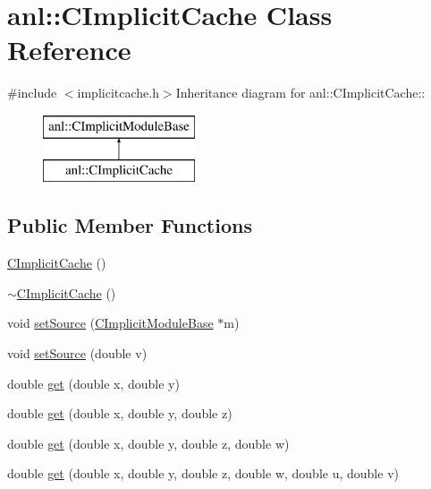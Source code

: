 \hypertarget{classanl_1_1CImplicitCache}{
\section{anl::CImplicitCache Class Reference}
\label{classanl_1_1CImplicitCache}
}


{\ttfamily \#include $<$implicitcache.h$>$}Inheritance diagram for anl::CImplicitCache::\begin{figure}[H]
\begin{center}
\leavevmode
\includegraphics[height=2cm]{classanl_1_1CImplicitCache}
\end{center}
\end{figure}
\subsection*{Public Member Functions}
\begin{DoxyCompactItemize}
\item 
\hyperlink{classanl_1_1CImplicitCache_a6053baf757980f4a4bd7aafacf928f6e}{CImplicitCache} ()
\item 
\hyperlink{classanl_1_1CImplicitCache_ad74fc72a3f2bdefa919bfb2bf717273c}{$\sim$CImplicitCache} ()
\item 
void \hyperlink{classanl_1_1CImplicitCache_a63e1430f37d3119878954f19fe25629b}{setSource} (\hyperlink{classanl_1_1CImplicitModuleBase}{CImplicitModuleBase} $\ast$m)
\item 
void \hyperlink{classanl_1_1CImplicitCache_a4941a8a7235fb8e9898e82b41f56e4ec}{setSource} (double v)
\item 
double \hyperlink{classanl_1_1CImplicitCache_a90f12b78d1a0b263d2fc142df64a52c9}{get} (double x, double y)
\item 
double \hyperlink{classanl_1_1CImplicitCache_aaf9fc4aff6c39b2e0815d6c285dc478f}{get} (double x, double y, double z)
\item 
double \hyperlink{classanl_1_1CImplicitCache_a0f5dff0ad736097091e6c02272701393}{get} (double x, double y, double z, double w)
\item 
double \hyperlink{classanl_1_1CImplicitCache_ab7cae239c57e693521e2038461a2f5bb}{get} (double x, double y, double z, double w, double u, double v)
\end{DoxyCompactItemize}
